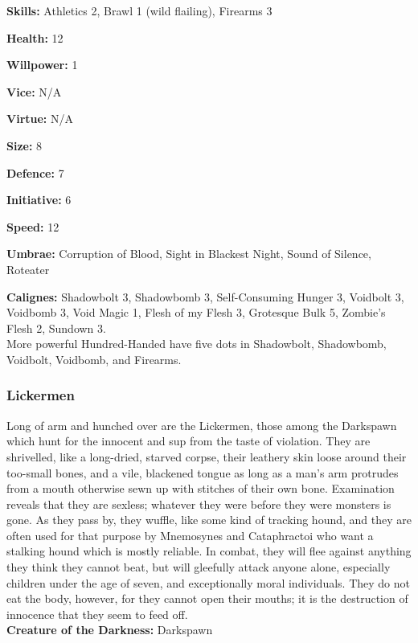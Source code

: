 \noindent \textbf{Skills:} Athletics 2, Brawl 1 (wild flailing), Firearms 3

\noindent \textbf{Health:} 12

\noindent \textbf{Willpower:} 1

\noindent \textbf{Vice:} N/A

\noindent \textbf{Virtue:} N/A

\noindent \textbf{Size:} 8

\noindent \textbf{Defence:} 7

\noindent \textbf{Initiative:} 6

\noindent \textbf{Speed:} 12

\noindent \textbf{Umbrae:} Corruption of Blood, Sight in Blackest Night, Sound of Silence, Roteater

\noindent \textbf{Calignes:} Shadowbolt 3, Shadowbomb 3, Self-Consuming Hunger 3, Voidbolt 3, Voidbomb 3, Void Magic 1, Flesh of my Flesh 3, Grotesque Bulk 5, Zombie's Flesh 2, Sundown 3.\\

\noindent More powerful Hundred-Handed have five dots in Shadowbolt, Shadowbomb, Voidbolt, Voidbomb, and Firearms.

\subsubsection*{Lickermen}

Long of arm and hunched over are the Lickermen, those among the Darkspawn which hunt for the innocent and sup from the taste of violation. They are shrivelled, like a long-dried, starved corpse, their leathery skin loose around their too-small bones, and a vile, blackened tongue as long as a man's arm protrudes from a mouth otherwise sewn up with stitches of their own bone. Examination reveals that they are sexless; whatever they were before they were monsters is gone. As they pass by, they wuffle, like some kind of tracking hound, and they are often used for that purpose by Mnemosynes and Cataphractoi who want a stalking hound which is mostly reliable. In combat, they will flee against anything they think they cannot beat, but will gleefully attack anyone alone, especially children under the age of seven, and exceptionally moral individuals. They do not eat the body, however, for they cannot open their mouths; it is the destruction of innocence that they seem to feed off.\\

\noindent \textbf{Creature of the Darkness:} Darkspawn

